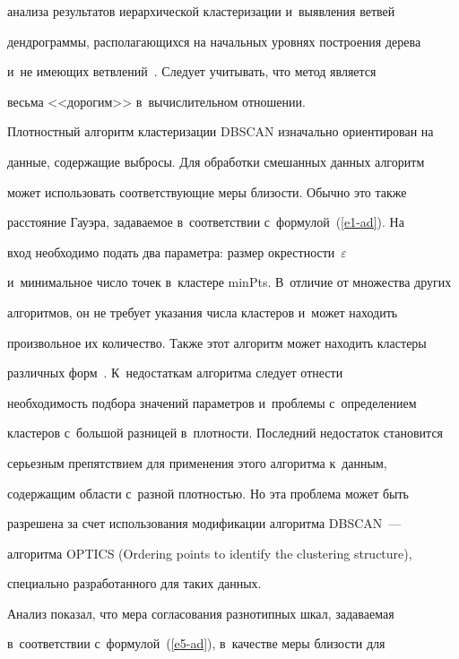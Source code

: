 анализа результатов иерархической кластеризации и~выявления ветвей 


дендрограммы, рас\-по\-ла\-га\-ющих\-ся на начальных уровнях по\-стро\-ения дерева 


и~не име\-ющих ветвлений~\cite{19-ad}. Следует учитывать, что метод является 


весьма <<дорогим>> в~вы\-чис\-ли\-тель\-ном отношении.


  


  Плотностный алгоритм кластеризации DBSCAN изначально ориентирован на 


данные, содержащие выбросы. Для обработки смешанных данных алгоритм 


может использовать соответствующие меры бли\-зости. Обычно это также 


расстояние Гауэра, задаваемое в~соответствии с~формулой~(\ref{e1-ad}). На 


вход необходимо подать два параметра: размер окрестности~$\varepsilon$ 


и~минимальное число точек в~кластере minPts. В~отличие от множества других 


алгоритмов, он не требует указания числа кластеров и~может находить 


произвольное их количество. Также этот алгоритм может находить кластеры 


различных форм~\cite{18-ad}. К~недостаткам алгоритма следует отнести 


необходимость подбора значений параметров и~проб\-ле\-мы с~определением 


кластеров с~большой разницей в~плот\-ности. Последний недостаток становится 


серьезным препятствием для применения этого алгоритма к~данным, 


содержащим области с~разной плот\-ностью. Но эта проб\-ле\-ма может быть 


разрешена за счет использования модификации алгоритма DBSCAN~--- 


алгоритма OPTICS (Ordering points to identify the clustering structure), 


специально разработанного для таких данных.


  


  Анализ показал, что мера согласования разнотипных шкал, задаваемая 


в~соответствии с~формулой~(\ref{e5-ad}), в~качестве меры близости для 


